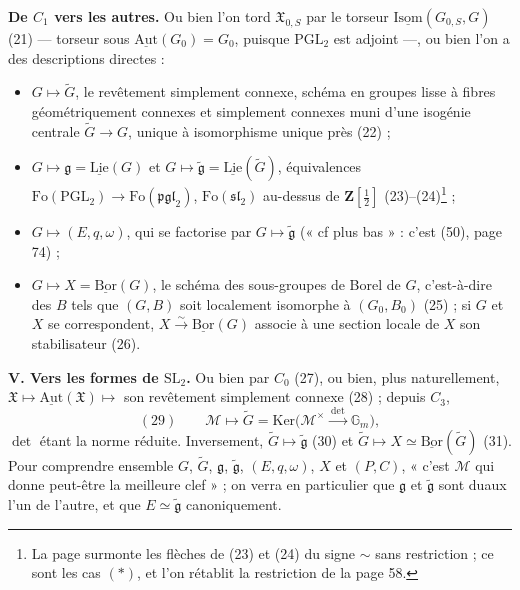 \documentclass[11pt,a4paper]{article}
\begin{document}
\textbf{De $C_1$ vers les autres.} Ou bien l'on tord $\mathfrak{X}_{0,S}$ par le
torseur $\underline{\mathrm{Isom}}(G_{0,S}, G)$ (21) — torseur sous
$\underline{\mathrm{Aut}}(G_0) = G_0$, puisque $\mathrm{PGL}_2$ est adjoint —, ou bien
l'on a des descriptions directes :
\begin{itemize}
  \item $G \mapsto \widetilde{G}$, le revêtement simplement connexe, schéma en
    groupes lisse à fibres géométriquement connexes et simplement connexes muni
    d'une isogénie centrale $\widetilde{G} \to G$, unique à isomorphisme unique près
    (22) ;
  \item $G \mapsto \mathfrak{g} = \underline{\mathrm{Lie}}(G)$ et $G \mapsto
    \widetilde{\mathfrak{g}} = \underline{\mathrm{Lie}}(\widetilde{G})$, équivalences
    $\mathrm{Fo}(\mathrm{PGL}_2) \to \mathrm{Fo}(\mathfrak{pgl}_2)$, $\mathrm{Fo}(\mathfrak{sl}_2)$
    au-dessus de $\mathbf{Z}[\tfrac{1}{2}]$ (23)--(24)\footnote{La page surmonte les
    flèches de (23) et (24) du signe $\sim$ sans restriction ; ce sont les cas
    $(*)$, et l'on rétablit la restriction de la page 58.} ;
  \item $G \mapsto (E, q, \omega)$, qui se factorise par $G \mapsto \widetilde{\mathfrak{g}}$
    (« cf plus bas » : c'est (50), page 74) ;
  \item $G \mapsto X = \underline{\mathrm{Bor}}(G)$, le schéma des sous-groupes de Borel
    de $G$, c'est-à-dire des $B$ tels que $(G, B)$ soit localement isomorphe à
    $(G_0, B_0)$ (25) ; si $G$ et $X$ se correspondent,
    $X \xrightarrow{\sim} \underline{\mathrm{Bor}}(G)$ associe à une section locale de $X$ son
    stabilisateur (26).
\end{itemize}

\textbf{V. Vers les formes de $\mathrm{SL}_2$.} Ou bien par $C_0$ (27), ou bien, plus
naturellement, $\mathfrak{X} \mapsto \underline{\mathrm{Aut}}(\mathfrak{X}) \mapsto$ son
revêtement simplement connexe (28) ; depuis $C_3$,
\[
  (29) \qquad \mathcal{M} \longmapsto \widetilde{G} = \mathrm{Ker}\bigl(\mathcal{M}^{\times}
  \xrightarrow{\ \det\ } \mathbb{G}_m\bigr),
\]
$\det$ étant la norme réduite. Inversement, $\widetilde{G} \mapsto \widetilde{\mathfrak{g}}$ (30)
et $\widetilde{G} \mapsto X \simeq \underline{\mathrm{Bor}}(\widetilde{G})$ (31). Pour
comprendre ensemble $G$, $\widetilde{G}$, $\mathfrak{g}$, $\widetilde{\mathfrak{g}}$,
$(E, q, \omega)$, $X$ et $(P, C)$, « c'est $\mathcal{M}$ qui donne peut-être la meilleure
clef » ; on verra en particulier que $\mathfrak{g}$ et $\widetilde{\mathfrak{g}}$ sont
duaux l'un de l'autre, et que $E \simeq \widetilde{\mathfrak{g}}$ canoniquement.
\end{document}

